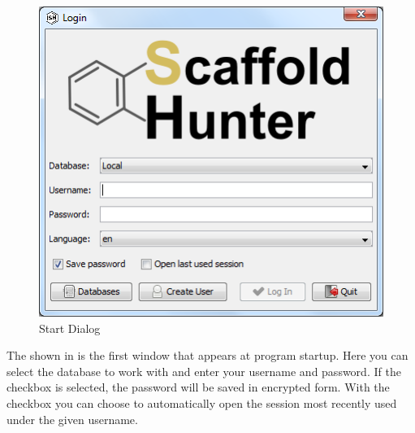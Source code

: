 \begin{figure}[ht]
   \centering
   \includegraphics[scale=0.8]{images/sh_start_dialog.png}
   \caption{Start Dialog}
   \label{fig:start_dialog}
\end{figure}

The  shown in  is the first window that appears at program startup. Here you can select the database to work with and enter your username and password. If the checkbox  is selected, the password will be saved in encrypted form. With the checkbox  you can choose to automatically open the session most recently used under the given username.
